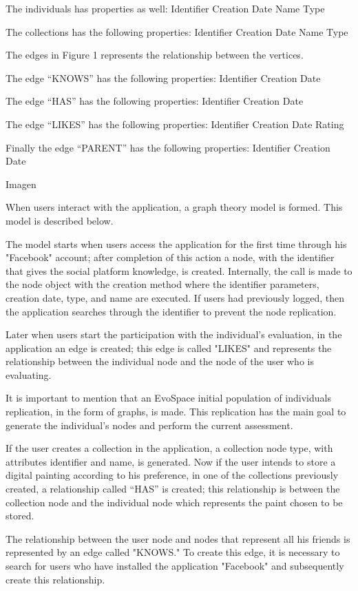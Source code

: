 The  individuals has properties as well: Identifier Creation Date Name Type

The collections has the following properties: Identifier Creation Date Name Type


The edges in Figure 1 represents the relationship between the vertices.

The edge “KNOWS” has the following properties: Identifier Creation Date

The edge “HAS” has the following properties: Identifier Creation Date

The edge “LIKES” has the following properties: Identifier Creation Date Rating

Finally the edge “PARENT” has the following properties: Identifier Creation Date

Imagen


When users interact with the application, a graph theory model is formed. This
model is described below.

The model starts when users access the application for the first time through
his "Facebook" account; after completion of this action a node, with the
identifier that gives the social platform knowledge, is created. Internally, the
call is made to the node object with the creation method where the identifier
parameters, creation date, type, and name are executed.  If users had previously
logged, then the application searches through the identifier to prevent the node
replication.

Later when users start the participation with the individual's evaluation, in
the application an edge is created; this edge is called "LIKES" and represents
the relationship between the individual node and the node of the user who is
evaluating.

It is important to mention that an EvoSpace initial population of individuals
replication, in the form of graphs, is made. This replication has the main goal
to generate the individual's nodes and perform the current assessment.

If the user creates a collection in the application, a collection node type,
with attributes identifier and name, is generated. Now if the user intends to
store a digital painting according to his preference, in one of the collections
previously created, a relationship called “HAS” is created; this relationship is
between the collection node and the individual node which represents the paint
chosen to be stored.

The relationship between the user node and nodes that represent all his friends
is represented by an edge called "KNOWS." To create this edge, it is necessary
to search for users who have installed the application "Facebook" and
subsequently create this relationship.

